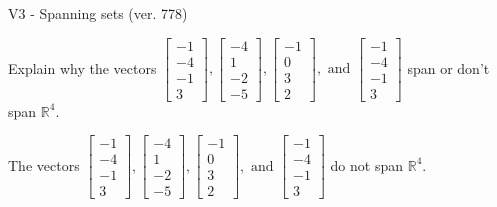 \begin{exercise}
  \begin{exerciseTitle}V3 - Spanning sets (ver. 778)\end{exerciseTitle}
  \begin{exerciseStatement}
    Explain why the vectors \(\left[\begin{array}{r}
-1 \\
-4 \\
-1 \\
3
\end{array}\right] , \left[\begin{array}{r}
-4 \\
1 \\
-2 \\
-5
\end{array}\right] , \left[\begin{array}{r}
-1 \\
0 \\
3 \\
2
\end{array}\right] , \text{ and } \left[\begin{array}{r}
-1 \\
-4 \\
-1 \\
3
\end{array}\right]\) span or don't span \(\mathbb{R}^4\). 
	


  \end{exerciseStatement}
  \begin{exerciseAnswer}
   The vectors \(\left[\begin{array}{r}
-1 \\
-4 \\
-1 \\
3
\end{array}\right] , \left[\begin{array}{r}
-4 \\
1 \\
-2 \\
-5
\end{array}\right] , \left[\begin{array}{r}
-1 \\
0 \\
3 \\
2
\end{array}\right] , \text{ and } \left[\begin{array}{r}
-1 \\
-4 \\
-1 \\
3
\end{array}\right]\) 
  	 do not  
	span \(\mathbb{R}^4\).
  


  \end{exerciseAnswer}
\end{exercise}